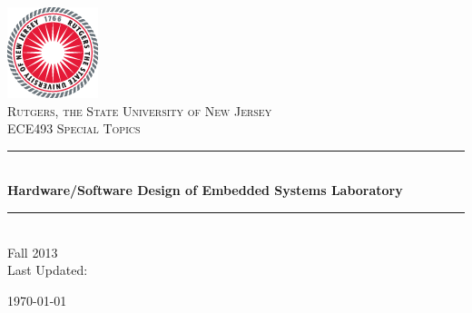 \documentclass[hidelinks]{article}
\begin{document}
\begin{titlepage}

\newcommand{\HRule}{\rule{\linewidth}{0.5mm}} %

\center %

\includegraphics{RU_INF_SEAL_CMYK}\\[1cm] %

\textsc{\LARGE Rutgers, the State University of New
Jersey}\\[1.5cm] %
\textsc{\Large ECE493 Special Topics}\\[0.5cm] %

\HRule \\[0.4cm]
{ \huge \bfseries Hardware/Software Design of Embedded Systems Laboratory}\\[0.4cm] %
\HRule \\[1.5cm]

{\large Fall 2013}\\[3cm] 

Last Updated:

\today
\vfill %

\end{titlepage}

\tableofcontents
\newpage






\newpage



\newpage



\newpage



\newpage



\newpage


\end{document}
